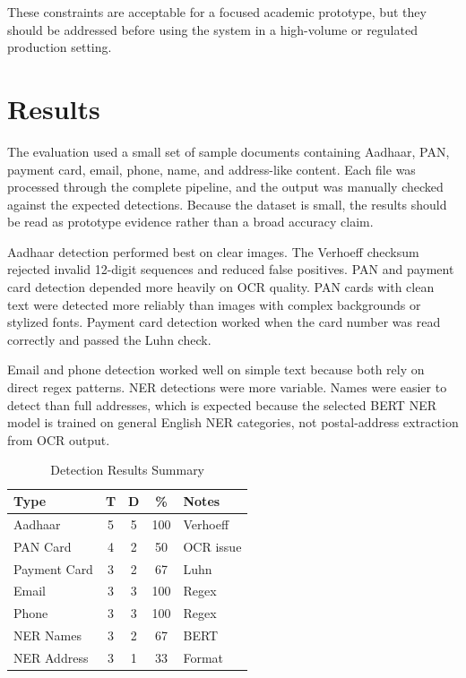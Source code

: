 These constraints are acceptable for a focused academic prototype, but they should be addressed before using the system in a high-volume or regulated production setting.

\section{Results}

The evaluation used a small set of sample documents containing Aadhaar, PAN, payment card, email, phone, name, and address-like content. Each file was processed through the complete pipeline, and the output was manually checked against the expected detections. Because the dataset is small, the results should be read as prototype evidence rather than a broad accuracy claim.

Aadhaar detection performed best on clear images. The Verhoeff checksum rejected invalid 12-digit sequences and reduced false positives. PAN and payment card detection depended more heavily on OCR quality. PAN cards with clean text were detected more reliably than images with complex backgrounds or stylized fonts. Payment card detection worked when the card number was read correctly and passed the Luhn check.

Email and phone detection worked well on simple text because both rely on direct regex patterns. NER detections were more variable. Names were easier to detect than full addresses, which is expected because the selected BERT NER model is trained on general English NER categories, not postal-address extraction from OCR output.

\begin{table}[htbp]
\small
\caption{Detection Results Summary}
\label{tab:detection_results}
\centering
\begin{tabular}{|l|c|c|c|p{2.2cm}|}
\hline
\textbf{Type} & \textbf{T} & \textbf{D} & \textbf{\%} & \textbf{Notes} \\
\hline
Aadhaar & 5 & 5 & 100 & Verhoeff \\
\hline
PAN Card & 4 & 2 & 50 & OCR issue \\
\hline
Payment Card & 3 & 2 & 67 & Luhn \\
\hline
Email & 3 & 3 & 100 & Regex \\
\hline
Phone & 3 & 3 & 100 & Regex \\
\hline
NER Names & 3 & 2 & 67 & BERT \\
\hline
NER Address & 3 & 1 & 33 & Format \\
\hline
\end{tabular}
\end{table}

